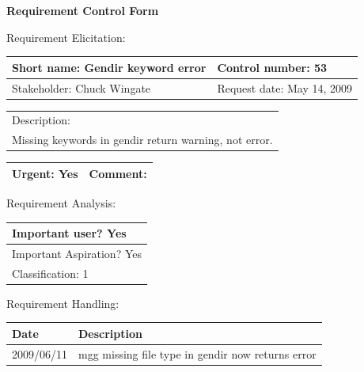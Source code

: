 \begin{center}\Large\bf
Requirement Control Form
\end{center}
\vspace{24pt}

Requirement Elicitation:

\begin{tabular}{|p{211pt}|p{211pt}|} \hline
Short name: Gendir keyword error & Control number: 53\\ \hline
Stakeholder: Chuck Wingate & Request date: May 14, 2009\\
\end{tabular}
\begin{tabular}{|p{433pt}|} \hline
Description: \\ 
Missing keywords in gendir return warning, not error.\\
\hline
\end{tabular} 
\begin{tabular}{|p{211pt}|p{211pt}|} \hline
Urgent: Yes & Comment: \\ \hline
\end{tabular}

\vspace{24pt}

Requirement Analysis:

\begin{tabular}{|p{433pt}|} \hline
Important user? Yes \\ \hline
Important Aspiration? Yes \\ \hline
Classification: 1 \\ \hline
\end{tabular}
\vspace{24pt}

Requirement Handling:

\begin{tabular}{|p{72pt}|p{351pt}|} \hline
Date & Description \\ \hline
2009/06/11 & mgg missing file type in gendir now returns error \\
\hline
\end{tabular}
